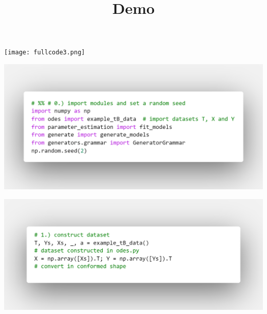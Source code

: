 \documentclass[t,usenames,dvipsnames]{beamer} %
\title{Demo}
\begin{document}
\begin{frame}
  \maketitle
\end{frame}
\begin{frame}
	\texttt{[image: fullcode3.png]}
\end{frame}





	





\begin{frame}
	\includegraphics[width=\paperwidth]{code-shots/0imports.png}
\end{frame}

\begin{frame}
	\includegraphics[width=\paperwidth]{code-shots/1dataset-construction.png}
\end{frame}
\end{document}
